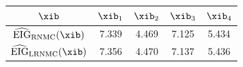 \begin{tabular}{|c|c|c|c|c|}
\hline
$\xib$ & \cellcolor{cyellow}$\xib_{1}$ & $\xib_{2}$ & $\xib_{3}$ & $\xib_{4}$ \\
\hline
$\widehat{\mathrm{EIG}}_{\mathrm{RNMC}}(\xib)$ & \cellcolor{cyellow}7.339 & 4.469 & 7.125 & 5.434 \\
\hline
$\widehat{\mathrm{EIG}}_{\mathrm{LRNMC}}(\xib)$ & \cellcolor{cyellow}7.356 & 4.470 & 7.137 & 5.436 \\
\hline
\end{tabular}